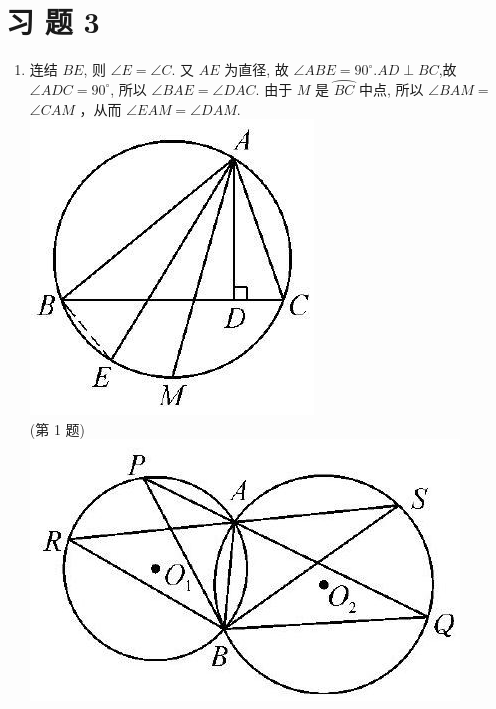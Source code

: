 \documentclass[10pt]{article}
\begin{document}
\section*{习 题 3}
\begin{enumerate}
  \item 连结 $B E$, 则 $\angle E=\angle C$. 又 $A E$ 为直径, 故 $\angle A B E=90^{\circ} . A D \perp B C$,故 $\angle A D C=90^{\circ}$, 所以 $\angle B A E=\angle D A C$. 由于 $M$ 是 $\overparen{B C}$ 中点, 所以 $\angle B A M=$ $\angle C A M$ ，从而 $\angle E A M=\angle D A M$.\\
\includegraphics[max width=\textwidth, center]{2024_10_30_66b8e5e701da2093c133g-089(1)}\\
(第 1 题)\\
\includegraphics[max width=\textwidth, center]{2024_10_30_66b8e5e701da2093c133g-089(4)}\\

\end{enumerate}
\end{document}
